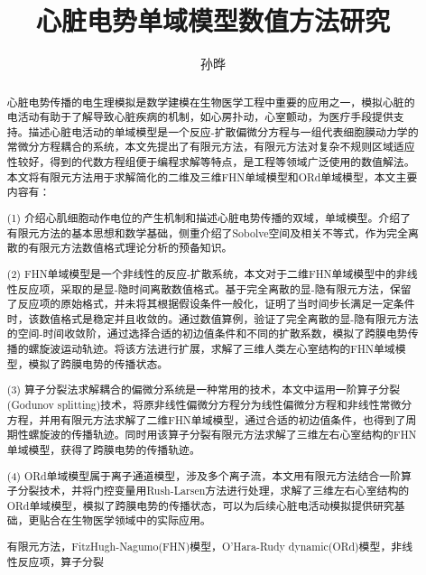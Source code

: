 \documentclass[twoside,UTF8]{nputhesis}
\title[Numerical Methods Research for The Monodomain Model of Cardiac Potential]{心脏电势单域模型数值方法研究}
\author[Sun Ye]{孙晔}
\begin{document}
\makecover  %
\frontmatter

\begin{abstract}
心脏电势传播的电生理模拟是数学建模在生物医学工程中重要的应用之一，模拟心脏的电活动有助于了解导致心脏疾病的机制，如心房扑动，心室颤动，为医疗手段提供支持。描述心脏电活动的单域模型是一个反应-扩散偏微分方程与一组代表细胞膜动力学的常微分方程耦合的系统，本文先提出了有限元方法，有限元方法对复杂不规则区域适应性较好，得到的代数方程组便于编程求解等特点，是工程等领域广泛使用的数值解法。本文将有限元方法用于求解简化的二维及三维FHN单域模型和ORd单域模型，本文主要内容有：

(1) 介绍心肌细胞动作电位的产生机制和描述心脏电势传播的双域，单域模型。介绍了有限元方法的基本思想和数学基础，侧重介绍了Sobolve空间及相关不等式，作为完全离散的有限元方法数值格式理论分析的预备知识。

(2) FHN单域模型是一个非线性的反应-扩散系统，本文对于二维FHN单域模型中的非线性反应项，采取的是显-隐时间离散数值格式。基于完全离散的显-隐有限元方法，保留了反应项的原始格式，并未将其根据假设条件一般化，证明了当时间步长满足一定条件时，该数值格式是稳定并且收敛的。通过数值算例，验证了完全离散的显-隐有限元方法的空间-时间收敛阶，通过选择合适的初边值条件和不同的扩散系数，模拟了跨膜电势传播的螺旋波运动轨迹。将该方法进行扩展，求解了三维人类左心室结构的FHN单域模型，模拟了跨膜电势的传播状态。

(3) 算子分裂法求解耦合的偏微分系统是一种常用的技术，本文中运用一阶算子分裂(Godunov splitting)技术，将原非线性偏微分方程分为线性偏微分方程和非线性常微分方程，并用有限元方法求解了二维FHN单域模型，通过合适的初边值条件，也得到了周期性螺旋波的传播轨迹。同时用该算子分裂有限元方法求解了三维左右心室结构的FHN单域模型，获得了跨膜电势的传播轨迹。

(4) ORd单域模型属于离子通道模型，涉及多个离子流，本文用有限元方法结合一阶算子分裂技术，并将门控变量用Rush-Larsen方法进行处理，求解了三维左右心室结构的ORd单域模型，模拟了跨膜电势的传播状态，可以为后续心脏电活动模拟提供研究基础，更贴合在生物医学领域中的实际应用。

\begin{keywords}
  有限元方法，FitzHugh-Nagumo(FHN)模型，O’Hara-Rudy dynamic(ORd)模型，非线性反应项，算子分裂     
\end{keywords}
\end{abstract}
\end{document}
